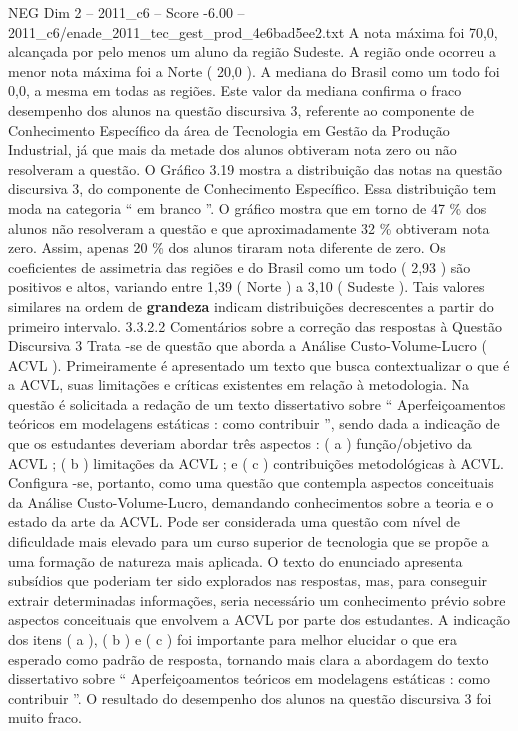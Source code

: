 \begin{textsample}{NEG Dim 2 – 2011\_c6 – Score -6.00 – 2011\_c6/enade\_2011\_tec\_gest\_prod\_4e6bad5ee2.txt}
A nota máxima foi 70,0, alcançada por pelo menos um aluno da região Sudeste.
A região onde ocorreu a menor nota máxima foi a Norte ( 20,0 ).
A mediana do Brasil como um todo foi 0,0, a mesma em todas as regiões.
Este valor da mediana confirma o fraco desempenho dos alunos na questão discursiva 3, referente ao componente de Conhecimento Específico da área de Tecnologia em Gestão da Produção Industrial, já que mais da metade dos alunos obtiveram nota zero ou não resolveram a questão.
O Gráfico 3.19 mostra a distribuição das notas na questão discursiva 3, do componente de Conhecimento Específico.
Essa distribuição tem moda na categoria “ em branco ”.
O gráfico mostra que em torno de 47 \% dos alunos não resolveram a questão e que aproximadamente 32 \% obtiveram nota zero.
Assim, apenas 20 \% dos alunos tiraram nota diferente de zero.
Os coeficientes de assimetria das regiões e do Brasil como um todo ( 2,93 ) são positivos e altos, variando entre 1,39 ( Norte ) a 3,10 ( Sudeste ).
Tais valores similares na ordem de \textbf{grandeza} indicam distribuições decrescentes a partir do primeiro intervalo. 3.3.2.2 Comentários sobre a correção das respostas à Questão Discursiva 3 Trata -se de questão que aborda a Análise Custo-Volume-Lucro ( ACVL ).
Primeiramente é apresentado um texto que busca contextualizar o que é a ACVL, suas limitações e críticas existentes em relação à metodologia.
Na questão é solicitada a redação de um texto dissertativo sobre “ Aperfeiçoamentos teóricos em modelagens estáticas : como contribuir ”, sendo dada a indicação de que os estudantes deveriam abordar três aspectos : ( a ) função/objetivo da ACVL ; ( b ) limitações da ACVL ; e ( c ) contribuições metodológicas à ACVL.
Configura -se, portanto, como uma questão que contempla aspectos conceituais da Análise Custo-Volume-Lucro, demandando conhecimentos sobre a teoria e o estado da arte da ACVL.
Pode ser considerada uma questão com nível de dificuldade mais elevado para um curso superior de tecnologia que se propõe a uma formação de natureza mais aplicada.
O texto do enunciado apresenta subsídios que poderiam ter sido explorados nas respostas, mas, para conseguir extrair determinadas informações, seria necessário um conhecimento prévio sobre aspectos conceituais que envolvem a ACVL por parte dos estudantes.
A indicação dos itens ( a ), ( b ) e ( c ) foi importante para melhor elucidar o que era esperado como padrão de resposta, tornando mais clara a abordagem do texto dissertativo sobre “ Aperfeiçoamentos teóricos em modelagens estáticas : como contribuir ”.
O resultado do desempenho dos alunos na questão discursiva 3 foi muito fraco.

\end{textsample}
